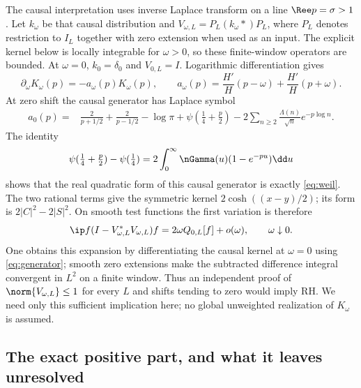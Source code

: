The causal interpretation uses inverse Laplace transform on a line
$\Ree p=\sigma>1$. Let $k_\omega$ be that causal distribution and
$V_{\omega,L}=P_L(k_\omega*)P_L$, where $P_L$ denotes restriction to
$I_L$ together with zero extension when used as an input. The explicit
kernel below is locally integrable for $\omega>0$, so these finite-window
operators are bounded. At $\omega=0$, $k_0=\delta_0$ and $V_{0,L}=I$.
Logarithmic differentiation gives
\begin{equation}
 \partial_\omega K_\omega(p)=-a_\omega(p)K_\omega(p),\qquad
 a_\omega(p)=\frac{H'}{H}(p-\omega)
             +\frac{H'}{H}(p+\omega).
\end{equation}
At zero shift the causal generator has Laplace symbol
\begin{align}\label{eq:generator}
 a_0(p)={}&\frac2{p+1/2}+\frac2{p-1/2}-\log\pi
 +\psi(\tfrac14+\tfrac p2)
 -2\sum_{n\geq2}\frac{\Lambda(n)}{\sqrt n}e^{-p\log n}.
\end{align}
The identity
\begin{equation}
 \psi(\tfrac14+\tfrac p2)-\psi(\tfrac14)
 =2\int_0^\infty\nGamma(u)(1-e^{-pu})\dd u
\end{equation}
shows that the real quadratic form of this causal generator is exactly
\eqref{eq:weil}. The two rational terms give the symmetric kernel
$2\cosh((x-y)/2)$; its form is $2|C|^2-2|S|^2$.
On smooth test functions the first variation is therefore
\begin{equation}\label{eq:first-variation-arithmetic}
 \ip f{(I-V_{\omega,L}^*V_{\omega,L})f}
 =2\omega Q_{0,L}[f]+o(\omega),\qquad\omega\downarrow0.
\end{equation}
One obtains this expansion by differentiating the causal kernel at
$\omega=0$ using \eqref{eq:generator}; smooth zero extensions make the
subtracted difference integral convergent in $L^2$ on a finite window.
Thus an independent proof of $\norm{V_{\omega,L}}\leq1$ for every $L$
and shifts tending to zero would imply RH. We need only this sufficient
implication here; no global unweighted realization of $K_\omega$ is
assumed.

\subsection{The exact positive part, and what it leaves unresolved}

